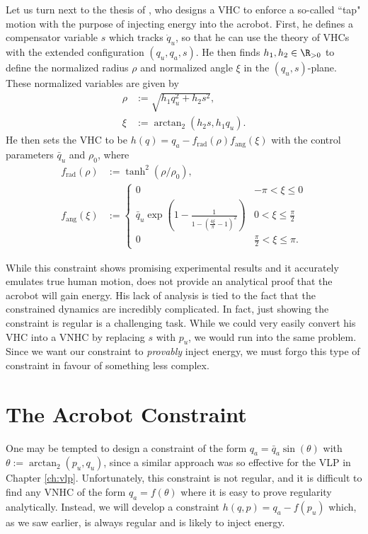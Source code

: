 Let us turn next to the thesis of \citet{xingbo_thesis}, who designs a VHC to enforce a
so-called ``tap" motion with the purpose of injecting energy into the acrobot. 
First, he defines a compensator variable \(s\) which tracks \(\dot{q}_u\), so
that he can use the theory of VHCs with the extended configuration 
\((q_u,q_a,s)\).
He then finds \(h_1, h_2 \in \R_{>0}\) to define the
normalized radius \(\rho\) and normalized angle \(\xi\) in the
\((q_u, s)\)-plane.
These normalized variables are given by
\begin{align*}
    \rho &:= \sqrt{h_1 q_u^2 + h_2 s^2}
    , \\
    \xi &:= \arctan_2(h_2 s, h_1 q_u)
    . 
\end{align*}
He then sets the VHC to be \(h(q) = q_a - f_\text{rad}(\rho)f_\text{ang}(\xi)\)
with the control parameters \(\bar{q}_u\) and \(\rho_0\), where
\begin{align}
    \label{eqn:xingbo-frad}
    f_\text{rad}(\rho) &:= \tanh^2(\rho/\rho_0)
    , \\
    \label{eqn:xingbo-fang}
    f_\text{ang}(\xi) &:= 
    \begin{cases}
        0 & -\pi < \xi \leq 0 \\
        \bar{q}_u \exp\left(1 - \frac{1}{1-(\frac{4\xi}{\pi} - 1)^2}\right) 
          & 0 < \xi \leq \frac{\pi}{2} \\
        0 & \frac{\pi}{2} < \xi \leq \pi
        .
    \end{cases}
\end{align}

While this constraint shows promising experimental results and it accurately
emulates true human motion, \citeauthor{xingbo_thesis}
does not provide an analytical proof that the acrobot will gain energy.
His lack of analysis is tied to the fact that the constrained
dynamics are incredibly complicated.
In fact, just showing the constraint is regular is a challenging task.
While we could very easily convert his VHC into a VNHC by replacing \(s\) with
\(p_u\), we would run into the same problem. 
Since we want our constraint to \textit{provably} inject energy, we must forgo
this type of constraint in favour of something less complex.

\section{The Acrobot Constraint}
One may be tempted to design a constraint of the form \(q_a = \bar{q}_a\sin(\theta)\) 
with \(\theta := \arctan_2(p_u,q_u)\), since a similar approach 
was so effective for the VLP in Chapter \ref{ch:vlp}.
Unfortunately, this constraint is not regular, and it is difficult to find any
VNHC of the form \(q_a = f(\theta)\) where it is easy to prove regularity
analytically.
Instead, we will develop a constraint \(h(q,p) = q_a - f(p_u)\) which,
as we saw earlier, is always regular and is likely to inject energy.
 
